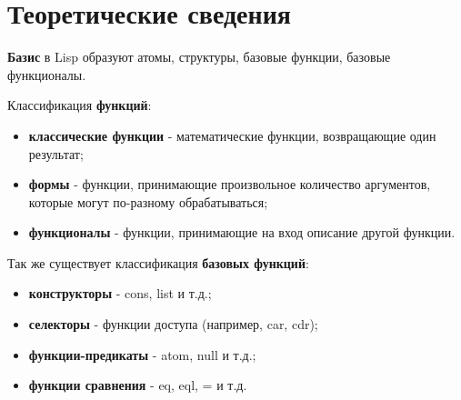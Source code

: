 \chapter{Теоретические сведения}
\textbf{Базис} в Lisp образуют атомы, структуры, базовые функции, базовые функционалы.

Классификация \textbf{функций}:
\begin{itemize}
    \item \textbf{классические функции} - математические функции, возвращающие один результат;
    \item \textbf{формы} - функции, принимающие произвольное количество аргументов, которые могут по-разному обрабатываться;
    \item \textbf{функционалы} - функции, принимающие на вход описание другой функции.
\end{itemize}

Так же существует классификация \textbf{базовых функций}:
\begin{itemize}
    \item \textbf{конструкторы} - cons, list и т.д.;
    \item \textbf{селекторы} - функции доступа (например, car, cdr);
    \item \textbf{функции-предикаты} - atom, null и т.д.;
    \item \textbf{функции сравнения} - eq, eql, = и т.д.
\end{itemize}

